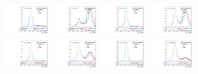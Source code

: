 \begin{figure}[htbp]
  \centering
  \includegraphics[width=0.21\textwidth]{fig/uncertainties/systs_res_e_HP_bb_LDy_scaleTopY_ProjY.pdf}
  \includegraphics[width=0.21\textwidth]{fig/uncertainties/systs_res_e_LP_bb_LDy_scaleTopY_ProjY.pdf}
  \includegraphics[width=0.21\textwidth]{fig/uncertainties/systs_res_e_HP_bb_HDy_scaleTopY_ProjY.pdf}
  \includegraphics[width=0.21\textwidth]{fig/uncertainties/systs_res_e_LP_bb_HDy_scaleTopY_ProjY.pdf}\\
  \includegraphics[width=0.21\textwidth]{fig/uncertainties/systs_res_e_HP_nobb_LDy_scaleTopY_ProjY.pdf}
  \includegraphics[width=0.21\textwidth]{fig/uncertainties/systs_res_e_LP_nobb_LDy_scaleTopY_ProjY.pdf}
  \includegraphics[width=0.21\textwidth]{fig/uncertainties/systs_res_e_HP_nobb_HDy_scaleTopY_ProjY.pdf}
  \includegraphics[width=0.21\textwidth]{fig/uncertainties/systs_res_e_LP_nobb_HDy_scaleTopY_ProjY.pdf}\\

\end{figure}
